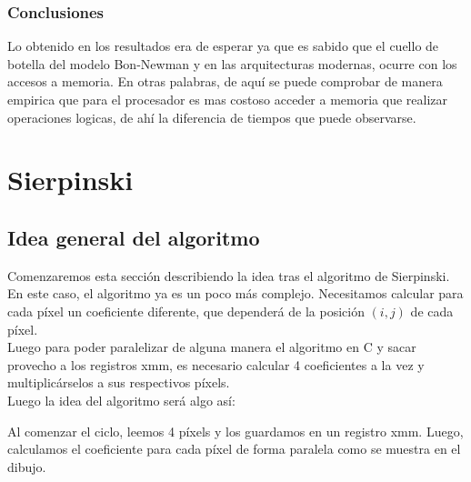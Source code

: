 \documentclass[a4paper]{article}
\begin{document}
\subsubsection{Conclusiones}

Lo obtenido en los resultados era de esperar ya que es sabido que el cuello de botella del modelo Bon-Newman y en las arquitecturas modernas, ocurre con los accesos a memoria. En otras palabras, de aquí se puede comprobar de manera empirica que para el procesador es mas costoso acceder a memoria que realizar operaciones logicas, de ahí la diferencia de tiempos que puede observarse. 

\newpage
\section{Sierpinski}

\subsection{Idea general del algoritmo}

Comenzaremos esta sección describiendo la idea tras el algoritmo de Sierpinski. En este caso, el algoritmo ya es un poco más complejo. Necesitamos calcular para cada píxel un coeficiente diferente, que dependerá de la posición $(i,j)$ de cada píxel.
\\
Luego para poder paralelizar de alguna manera el algoritmo en C y sacar provecho a los registros xmm, es necesario calcular 4 coeficientes a la vez y multiplicárselos a sus respectivos píxels.
\\
Luego la idea del algoritmo será algo así:

Al comenzar el ciclo, leemos 4 píxels y los guardamos en un registro xmm. Luego, calculamos el coeficiente para cada píxel de forma paralela como se muestra en el dibujo.
\end{document}
